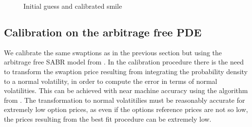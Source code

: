 \documentclass[]{rAMF2e}
\begin{document}
\begin{figure}[htb]
  \begin{center}  
  \end{center}
     \caption{Initial guess and calibrated smile}
\end{figure}


\subsection{Calibration on the arbitrage free PDE}
We calibrate the same swaptions as in the previous section but using the arbitrage free SABR model from \citep{hagan2013arbitrage}. In the calibration procedure there is the need to transform the swaption price resulting from integrating the probability density to a normal volatility, in order to compute the error in terms of normal volatilities. This can be achieved with near machine accuracy using the algorithm from \citep{lefloch2014bpvol}. The transformation to normal volatitilies must be reasonably accurate for extremely low option prices, as even if the options reference prices are not so low, the prices resulting from the best fit procedure can be extremely low.
\end{document}
